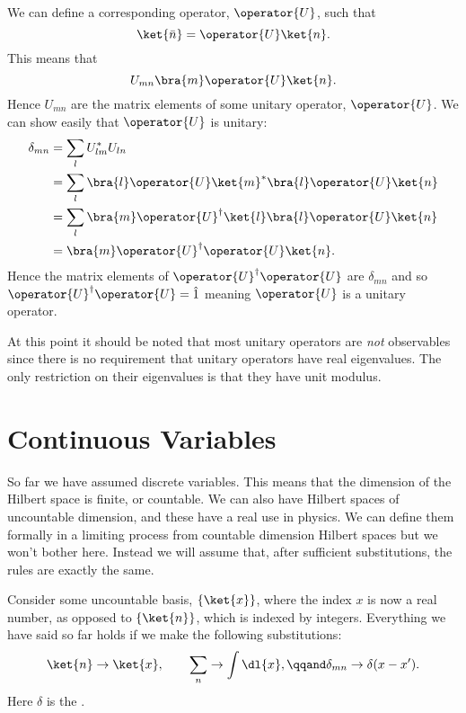 \documentclass[fleqn]{NotesClass}
\newcommand*{\idop}{\hat{1}}
\newcommand*{\hermit}{\dagger}
\begin{document}
    We can define a corresponding operator, \(\operator{U}\), such that
    \begin{equation}
        \ket{\bar{n}} = \operator{U}\ket{n}.
    \end{equation}
    This means that
    \begin{equation}
        U_{mn} \bra{m}\operator{U}\ket{n}.
    \end{equation}
    Hence \(U_{mn}\) are the matrix elements of some unitary operator, \(\operator{U}\).
    We can show easily that \(\operator{U}\) is unitary:
    \begin{align}
        \delta_{mn} &= \sum_{l}U_{lm}^*U_{ln}\\
        &= \sum_l \bra{l}\operator{U}\ket{m}^*\bra{l}\operator{U}\ket{n}\\
        &= \sum_l \bra{m}\operator{U}^\hermit\ket{l}\bra{l}\operator{U}\ket{n}\\
        &= \bra{m}\operator{U}^\hermit \operator{U} \ket{n}.
    \end{align}
    Hence the matrix elements of \(\operator{U}^\hermit \operator{U}\) are \(\delta_{mn}\) and so \(\operator{U}^\hermit \operator{U} = \idop\) meaning \(\operator{U}\) is a unitary operator.
    
    At this point it should be noted that most unitary operators are \emph{not} observables since there is no requirement that unitary operators have real eigenvalues.
    The only restriction on their eigenvalues is that they have unit modulus.
    
    \section{Continuous Variables}
    So far we have assumed discrete variables.
    This means that the dimension of the Hilbert space is finite, or countable.
    We can also have Hilbert spaces of uncountable dimension, and these have a real use in physics.
    We can define them formally in a limiting process from countable dimension Hilbert spaces but we won't bother here.
    Instead we will assume that, after sufficient substitutions, the rules are exactly the same.
    
    Consider some uncountable basis, \(\{\ket{x}\}\), where the index \(x\) is now a real number, as opposed to \(\{\ket{n}\}\), which is indexed by integers.
    Everything we have said so far holds if we make the following substitutions:
    \begin{equation}
         \ket{n} \to \ket{x}, \qquad \sum_n \to\int\dl{x}, \qqand \delta_{mn} \to \delta(x - x').
    \end{equation}
    Here \(\delta\) is the .
    
\end{document}
